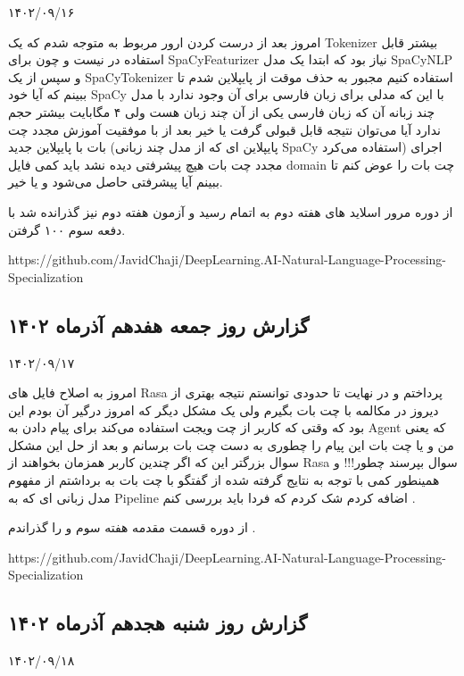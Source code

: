 ۱۴۰۲/۰۹/۱۶

امروز بعد از درست کردن ارور مربوط به  متوجه شدم که یک Tokenizer بیشتر قابل استفاده در  نیست و چون برای SpaCyFeaturizer نیاز بود که ابتدا یک مدل SpaCyNLP و سپس از یک SpaCyTokenizer استفاده کنیم مجبور به حذف موقت  از پایپلاین شدم تا ببینم که آیا خود SpaCy با این که مدلی برای زبان فارسی برای آن وجود ندارد با مدل چند زبانه آن که زبان فارسی یکی از آن چند زبان هست ولی ۴ مگابایت بیشتر حجم ندارد آیا می‌توان نتیجه قابل قبولی گرفت یا خیر
بعد از با موفقیت آموزش مجدد چت بات با پایپلاین جدید (پایپلاین ای که از مدل چند زبانی SpaCy استفاده می‌کرد) اجرای مجدد چت بات هیچ پیشرفتی دیده نشد باید کمی فایل domain چت بات را عوض کنم تا ببینم آیا پیشرفتی حاصل می‌شود و یا خیر.

از دوره  مرور اسلاید های هفته دوم به اتمام رسید و آزمون هفته دوم نیز گذرانده شد با دفعه سوم ۱۰۰ گرفتن.

https://github.com/JavidChaji/DeepLearning.AI-Natural-Language-Processing-Specialization


\subsection{گزارش روز جمعه هفدهم آذر‌ماه ۱۴۰۲}

۱۴۰۲/۰۹/۱۷

امروز به اصلاح فایل های Rasa پرداختم و در نهایت تا حدودی توانستم نتیجه بهتری از دیروز در مکالمه با چت بات بگیرم ولی یک مشکل دیگر که امروز درگیر آن بودم این بود که وقتی که کاربر از چت ویجت استفاده می‌کند برای پیام دادن به Agent که یعنی من و یا چت بات این پیام را چطوری به دست چت بات برسانم و بعد از حل این مشکل سوال بزرگتر این که اگر چندین کاربر همزمان بخواهند از Rasa سوال بپرسند چطور!!!
و همینطور کمی با توجه به نتایج گرفته شده از گفتگو با چت بات به برداشتم از مفهوم مدل زبانی ای که به Pipeline اضافه کردم شک کردم که فردا باید بررسی کنم .

از دوره  قسمت مقدمه هفته سوم و  را گذراندم .

https://github.com/JavidChaji/DeepLearning.AI-Natural-Language-Processing-Specialization


\subsection{گزارش روز شنبه هجدهم آذر‌ماه ۱۴۰۲}

۱۴۰۲/۰۹/۱۸

